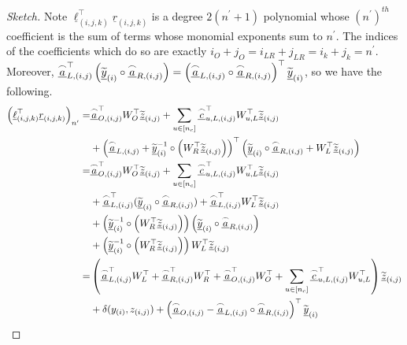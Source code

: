 \documentclass{article}
\theoremstyle{definition}
\newcommand{\zq}{\widetilde{\underline{z}}}
\newcommand{\yq}{\widetilde{\underline{y}}}
\begin{document}
\begin{proof}[Sketch]
Note $\underline{\ell}_{(i,j,k)}^\top \underline{r}_{(i,j,k)}$
is a degree $2(n^\prime+1)$ polynomial whose $(n^\prime)^{th}$ coefficient is the sum of terms whose monomial exponents sum to $n^\prime$. The indices of the coefficients which do so are exactly 
$i_O + j_O = i_{LR} + j_{LR} = i_k + j_k = n^\prime$. Moreover, $\underline{\overset{\LARGE \frown}{\small{a}}}_{L,(i,j)}^\top \left(\yq_{(i)} \circ \underline{\overset{\LARGE \frown}{\small{a}}}_{R,(i,j)}\right) = \left(\underline{\overset{\LARGE \frown}{\small{a}}}_{L,(i,j)} \circ \underline{\overset{\LARGE \frown}{\small{a}}}_{R,(i,j)}\right)^\top \yq_{(i)}$, so we have the following. 
\begin{align*}
\left(\underline{\ell}_{(i,j,k)}^\top \underline{r}_{(i,j,k)}\right)_{n^\prime} =& \underline{\overset{\LARGE \frown}{\small{a}}}_{O,(i,j)}^\top W^\top_O \zq_{(i,j)} + \sum_{u \in [n_c]} \underline{\overset{\LARGE \frown}{\small{c}}}_{u,L,(i,j)}^\top W^\top_{u,L} \zq_{(i,j)} \\
& + \left(\underline{\overset{\LARGE \frown}{\small{a}}}_{L,(i,j)} + \yq^{-1}_{(i)} \circ \left(W_R^\top\zq_{(i,j)}\right)\right)^\top\left(\yq_{(i)} \circ \underline{\overset{\LARGE \frown}{\small{a}}}_{R,(i,j)} + W_L^\top\zq_{(i,j)}\right) \\
=& \underline{\overset{\LARGE \frown}{\small{a}}}_{O,(i,j)}^\top W^\top_O \zq_{(i,j)} + \sum_{u \in [n_c]} \underline{\overset{\LARGE \frown}{\small{c}}}_{u,L,(i,j)}^\top W^\top_{u,L} \zq_{(i,j)} \\
& + \underline{\overset{\LARGE \frown}{\small{a}}}^\top_{L,(i,j)} (\yq_{(i)} \circ \underline{\overset{\LARGE \frown}{\small{a}}}_{R,(i,j)})  +  \underline{\overset{\LARGE \frown}{\small{a}}}^\top_{L,(i,j)}  W^\top_L \zq_{(i,j)} \\
& + \left(\yq_{(i)}^{-1} \circ \left(W^\top_R \zq_{(i,j)}\right)\right) \left(\yq_{(i)} \circ  \underline{\overset{\LARGE \frown}{\small{a}}}_{R,(i,j)} \right) \\
& + \left(\yq^{-1}_{(i)} \circ \left(W_R^\top \zq_{(i,j)} \right)\right)W^\top_L \zq_{(i,j)}\\
=& \left(\underline{\overset{\LARGE \frown}{\small{a}}}_{L,(i,j)}^\top W_L^\top  + \underline{\overset{\LARGE \frown}{\small{a}}}_{R,(i,j)}^\top W_R^\top  + \underline{\overset{\LARGE \frown}{\small{a}}}_{O,(i,j)}^\top W^\top_O  + \sum_{u \in [n_c]} \underline{\overset{\LARGE \frown}{\small{c}}}^\top_{u,L,(i,j)} W^\top_{u,L}\right)\zq_{(i,j)} \\
&  + \delta(y_{(i)},z_{(i,j)}) + \left(\underline{\overset{\LARGE \frown}{\small{a}}}_{O,(i,j)} - \underline{\overset{\LARGE \frown}{\small{a}}}_{L,(i,j)} \circ \underline{\overset{\LARGE \frown}{\small{a}}}_{R,(i,j)}\right)^\top \yq_{(i)}

\end{align*}
\end{proof}
\end{document}
